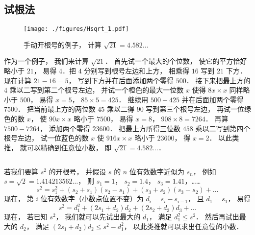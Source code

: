 
\subsection{试根法}

\begin{example}{}
\begin{figure}[ht]
\centering
\texttt{[image: ./figures/Hsqrt\_1.pdf]}
\caption{手动开根号的例子， 计算 $\sqrt{21} = 4.582\dots$} \label{Hsqrt_fig1}
\end{figure}
作为一个例子， 我们来计算 $\sqrt{21}$． 首先试一个最大的个位数， 使它的平方恰好略小于 $21$， 易得 $4$．把 $4$ 分别写到根号左边和上方， 相乘得 $16$ 写到 $21$ 下方． 现在计算 $21-16 = 5$， 写到下方并在后面添加两个零得 $500$． 接下来把最上方的 $4$ 乘以二写到第二个根号左边， 并试一个橙色的最大一位数 $x$ 使得 $8x\times x$ 同样略小于 $500$， 易得 $x = 5$， $85\times 5 = 425$． 继续用 $500-425$ 并在后面加两个零得 $7500$． 把当前最上方的两位数 $45$ 乘以二得 $90$ 写到第三个根号左边， 再试一位绿色的数 $x$， 使 $90 x\times x$ 略小于 $7500$， 易得 $x = 8$， $908\times 8 = 7264$． 再算 $7500-7264$， 添加两个零得 $23600$． 把最上方所得三位数 $458$ 乘以二写到第四个根号左边， 试一位蓝色的数 $x$ 使 $916x\times x$ 略小于 $23600$， 得 $x = 2$． 以此类推， 就可以精确到任意位小数， 即 $\sqrt{21} = 4.582\dots$．
\end{example}

\subsection{}
若我们要算 $s^2$ 的开根号， 并假设 $s$ 的 $n$ 位有效数字近似为 $s_n$， 例如 $s = \sqrt{2} = 1.414213562\dots$， 则 $s_1 = 1$， $s_2=1.4$， $s_3=1.41$，……
\begin{equation}
s^2 = s_1^2 + (s_2+s_1)(s_2-s_1) + (s_3+s_2)(s_3-s_2) + \dots
\end{equation}
现在， 第 $i$ 位有效数字（小数点位置不变）为 $d_i = s_i-s_{i-1}$， 且 $d_1 = s_1$， 易得
\begin{equation}
s^2 = d_1^2 + (2s_1 + d_2)d_2 + (2s_2 + d_3)d_3 + \dots
\end{equation}
现在， 若已知 $s^2$， 我们就可以先试出最大的 $d_1$， 满足 $d_1^2\leqslant s^2$． 然后再试出最大的 $d_2$， 满足 $(2s_1 + d_2)d_2 \leqslant s^2 - d_1^2$， 以此类推就可以求出任意位的小数．
